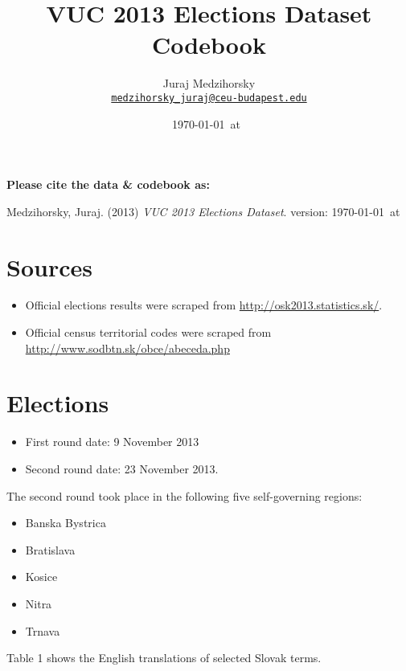 \documentclass[11pt, a4paper]{article}
\title{VUC 2013 Elections Dataset Codebook}
\author{
	Juraj Medzihorsky \\
	\href{mailto:medzihorsky_juraj@ceu-budapest.edu}{\texttt{medzihorsky\_juraj@ceu-budapest.edu}}
}
\date{\ddmmyyyydate\today~at~\currenttime}
\begin{document}
\maketitle

\noindent
\textbf{Please cite the data \& codebook as:}

\noindent
Medzihorsky, Juraj. (2013) \textsl{VUC 2013 Elections Dataset}. version: \ddmmyyyydate\today~at~\currenttime

\tableofcontents

\section{Sources}

\begin{itemize}
	\item	Official elections results were scraped from \href{http://osk2013.statistics.sk/}{http://osk2013.statistics.sk/}.
	\item	Official census territorial codes were scraped from \href{http://www.sodbtn.sk/obce/abeceda.php}{http://www.sodbtn.sk/obce/abeceda.php}
\end{itemize}


\section{Elections}

\begin{itemize}
	\item	First round date:  9 November 2013
	\item	Second round date:  23 November 2013.
\end{itemize}

The second round took place in the following five
self-governing regions:

\begin{itemize}
	\item	Banska Bystrica		
	\item	Bratislava
	\item	Kosice
	\item	Nitra
	\item	Trnava
\end{itemize}


Table 1 shows the English translations of selected Slovak terms. 
\end{document}
